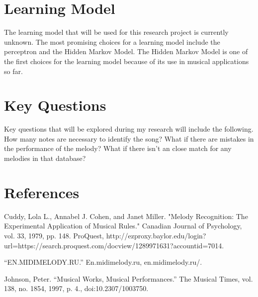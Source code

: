 \documentclass{article}
\begin{document}
	\section{Learning Model}
	The learning model that will be used for this research project is currently unknown. The most promising choices for a learning model include the perceptron and the Hidden Markov Model. The Hidden Markov Model is one of the first choices for the learning model because of its use in musical applications so far.
	
	\section{Key Questions}
	Key questions that will be explored during my research will include the following. How many notes are necessary to identify the song? What if there are mistakes in the performance of the melody? What if there isn't an close match for any melodies in that database?
	
	\section{References}
	Cuddy, Lola L., Annabel J. Cohen, and Janet Miller. "Melody Recognition: The Experimental Application of Musical Rules." Canadian Journal of Psychology, vol. 33, 1979, pp. 148. ProQuest, http://ezproxy.baylor.edu/login?url=https://search.proquest.com/docview/1289971631?accountid=7014.
	\newline
	
	\noindent
	“EN.MIDIMELODY.RU.” En.midimelody.ru, en.midimelody.ru/.
	\newline
	
	\noindent
	Johnson, Peter. “Musical Works, Musical Performances.” The Musical Times, vol. 138, no. 1854, 1997, p. 4., doi:10.2307/1003750.
	
\end{document}
